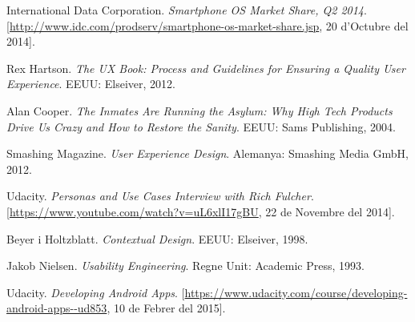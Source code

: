\begin{thebibliography}{9}

International Data Corporation. \textit{Smartphone OS Market Share, Q2 2014}. [\url{http://www.idc.com/prodserv/smartphone-os-market-share.jsp}, 20 d'Octubre del 2014].

Rex Hartson. \textit{The UX Book: Process and Guidelines for Ensuring a Quality User Experience}. EEUU: Elseiver, 2012. %

Alan Cooper. \textit{The Inmates Are Running the Asylum: Why High Tech Products Drive Us Crazy and How to Restore the Sanity}. EEUU: Sams Publishing, 2004.

Smashing Magazine. \textit{User Experience Design}. Alemanya: Smashing Media GmbH, 2012. %

Udacity. \textit{Personas and Use Cases Interview with Rich Fulcher}. [\url{https://www.youtube.com/watch?v=uL6xlI17gBU}, 22 de Novembre del 2014]. 

Beyer i Holtzblatt. \textit{Contextual Design}. EEUU: Elseiver, 1998.

Jakob Nielsen. \textit{Usability Engineering}. Regne Unit: Academic Press, 1993.

Udacity. \textit{Developing Android Apps}. [\url{https://www.udacity.com/course/developing-android-apps--ud853}, 10 de Febrer del 2015]. 




\end{thebibliography}
